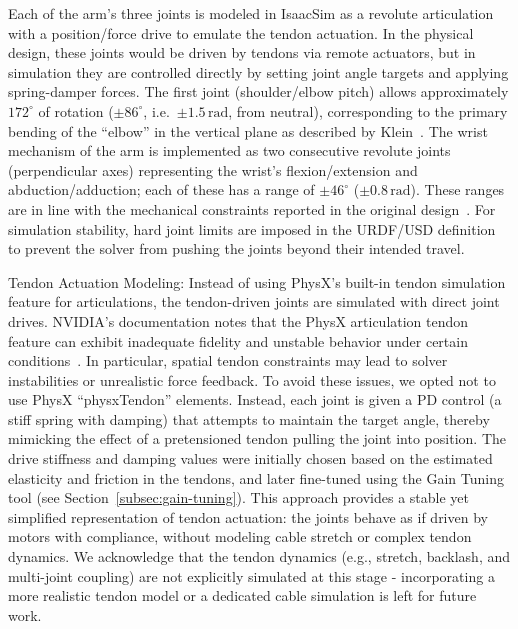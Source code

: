 Each of the arm's three joints is modeled in IsaacSim as a revolute articulation with a position/force drive to emulate the tendon actuation. In the physical design, these joints would be driven by tendons via remote actuators, but in simulation they are controlled directly by setting joint angle targets and applying spring-damper forces. The first joint (shoulder/elbow pitch) allows approximately $172^\circ$ of rotation ($\pm 86^\circ$, i.e.\ $\pm 1.5\,\mathrm{rad}$, from neutral), corresponding to the primary bending of the ``elbow'' in the vertical plane as described by Klein~\cite{Klein2023}. The wrist mechanism of the arm is implemented as two consecutive revolute joints (perpendicular axes) representing the wrist's flexion/extension and abduction/adduction; each of these has a range of $\pm 46^\circ$ ($\pm 0.8\,\mathrm{rad}$). These ranges are in line with the mechanical constraints reported in the original design~\cite{Klein2023}. For simulation stability, hard joint limits are imposed in the \ac{URDF}/\ac{USD} definition to prevent the solver from pushing the joints beyond their intended travel.

Tendon Actuation Modeling: Instead of using PhysX's built-in tendon simulation feature for articulations, the tendon-driven joints are simulated with direct joint drives. NVIDIA's documentation notes that the PhysX articulation tendon feature can exhibit inadequate fidelity and unstable behavior under certain conditions~\cite{IsaacSimDoc}. In particular, spatial tendon constraints may lead to solver instabilities or unrealistic force feedback. To avoid these issues, we opted not to use PhysX ``physxTendon'' elements. Instead, each joint is given a \ac{PD} control (a stiff spring with damping) that attempts to maintain the target angle, thereby mimicking the effect of a pretensioned tendon pulling the joint into position. The drive stiffness and damping values were initially chosen based on the estimated elasticity and friction in the tendons, and later fine-tuned using the Gain Tuning tool (see Section~\ref{subsec:gain-tuning}). This approach provides a stable yet simplified representation of tendon actuation: the joints behave as if driven by motors with compliance, without modeling cable stretch or complex tendon dynamics. We acknowledge that the tendon dynamics (e.g., stretch, backlash, and multi-joint coupling) are not explicitly simulated at this stage - incorporating a more realistic tendon model or a dedicated cable simulation is left for future work.

